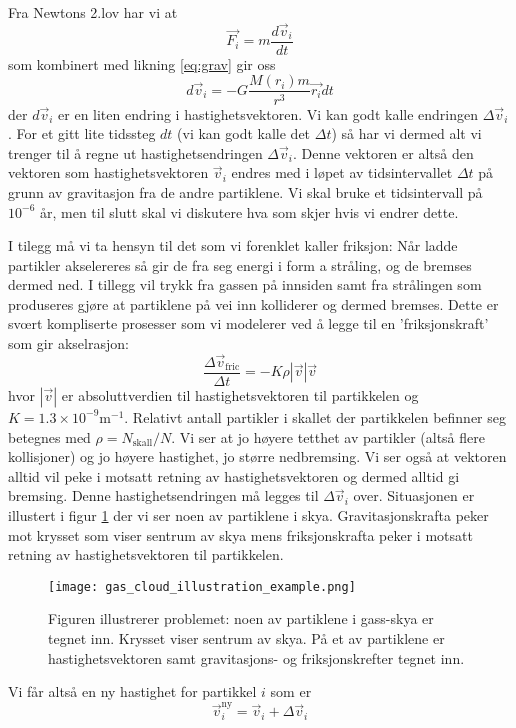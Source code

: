 \documentclass[reprint,english,notitlepage]{revtex4-1}  %
\begin{document}
Fra Newtons 2.lov har vi at
\[
\vec{F_i}=m\frac{d\vec{v}_i}{dt}
\]
som kombinert med likning \ref{eq:grav} gir oss
\[
d\vec{v}_i=-G\frac{M(r_i)m}{r^3}\vec{r_i}dt
\]
der $d\vec{v}_i$ er en liten endring i hastighetsvektoren. Vi kan godt kalle endringen $\Delta\vec{v}_i$. For et gitt lite tidssteg $dt$ (vi kan godt kalle det $\Delta t$) så har vi dermed alt vi trenger til å regne ut hastighetsendringen $\Delta\vec{v}_i$. Denne vektoren er altså den vektoren som hastighetsvektoren $\vec{v}_i$ endres med i løpet av tidsintervallet $\Delta t$ på grunn av gravitasjon fra de andre partiklene. Vi skal bruke et tidsintervall på  $10^{-6}$ år, men til slutt skal vi diskutere hva som skjer hvis vi endrer dette.

I tilegg må vi ta hensyn til det som vi forenklet kaller friksjon: Når ladde partikler akselereres så gir de fra seg energi i form a stråling, og de bremses dermed ned. I tillegg vil trykk fra gassen på innsiden samt fra strålingen som produseres gjøre at partiklene på vei inn kolliderer og dermed bremses. Dette er svœrt kompliserte prosesser som vi modelerer ved å legge til en 'friksjonskraft' som gir akselrasjon:
\[
\frac{\Delta\vec{v}_\mathrm{fric}}{\Delta t}=-K\rho|\vec{v}|\vec{v}
\]
hvor $|\vec{v}|$ er absoluttverdien til hastighetsvektoren til partikkelen og $K=1.3\times10^{-9}\mathrm{m}^{-1}$. Relativt antall partikler i skallet der partikkelen befinner seg betegnes med $\rho=N_\mathrm{skall}/N$. Vi ser at jo høyere tetthet av partikler (altså flere kollisjoner) og jo høyere hastighet, jo større nedbremsing. Vi ser også at vektoren alltid vil peke i motsatt retning av hastighetsvektoren og dermed alltid gi bremsing. Denne hastighetsendringen må legges til $\Delta\vec{v}_i$ over. Situasjonen er illustert i figur \ref{fig:illustrasjon} der vi ser noen av partiklene i skya. Gravitasjonskrafta peker mot krysset som viser sentrum av skya mens friksjonskrafta peker i motsatt retning av hastighetsvektoren til partikkelen.

\begin{figure}[htbp]
\texttt{[image: gas\_cloud\_illustration\_example.png]}
\caption{Figuren illustrerer problemet: noen av partiklene i gass-skya er tegnet inn. Krysset viser sentrum av skya. På et av partiklene er hastighetsvektoren samt gravitasjons- og friksjonskrefter tegnet inn.\label{fig:illustrasjon}} 
\end{figure}

Vi får altså en ny hastighet for partikkel $i$ som er
\begin{equation}
\label{eq:euler1}
\vec{v}_i^\mathrm{ny}=\vec{v}_i+\Delta\vec{v}_i
\end{equation}
\end{document}
